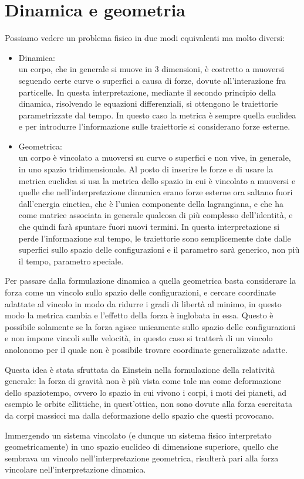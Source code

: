 \documentclass[
10pt, %
a4paper, %
oneside, %
headinclude,footinclude, %
BCOR5mm, %
]{scrartcl}
\begin{document}
\section{Dinamica e geometria}
Possiamo vedere un problema fisico in due modi equivalenti ma molto diversi:
\begin{itemize}
\item Dinamica: \\
un corpo, che in generale si muove in 3 dimensioni, è costretto a muoversi seguendo certe curve o superfici a causa di forze, dovute all'interazione fra particelle. In questa interpretazione, mediante il secondo principio della dinamica, risolvendo le equazioni differenziali, si ottengono le traiettorie parametrizzate dal tempo. In questo caso la metrica è sempre quella euclidea e per introdurre l'informazione sulle traiettorie si considerano forze esterne.
\item Geometrica: \\
un corpo è vincolato a muoversi su curve o superfici e non vive, in generale, in uno spazio tridimensionale. Al posto di inserire le forze e di usare la metrica euclidea si usa la metrica dello spazio in cui è vincolato a muoversi e quelle che nell'interpretazione dinamica erano forze esterne ora saltano fuori dall'energia cinetica, che è l'unica componente della lagrangiana, e che ha come matrice associata in generale qualcosa di più complesso dell'identità, e che quindi farà spuntare fuori nuovi termini. In questa interpretazione si perde l'informazione sul tempo, le traiettorie sono semplicemente date dalle superfici sullo spazio delle configurazioni e il parametro sarà generico, non più il tempo, parametro speciale.
\end{itemize}
Per passare dalla formulazione dinamica a quella geometrica basta considerare la forza come un vincolo sullo spazio delle configurazioni, e cercare coordinate adattate al vincolo in modo da ridurre i gradi di libertà al minimo, in questo modo la metrica cambia e l'effetto della forza è inglobata in essa. Questo è possibile solamente se la forza agisce unicamente sullo spazio delle configurazioni e non impone vincoli sulle velocità, in questo caso si tratterà di un vincolo anolonomo per il quale non è possibile trovare coordinate generalizzate adatte.
\begin{esempio} 
 	Questa idea è stata sfruttata da Einstein nella formulazione della relatività generale: la forza di gravità non è più vista come tale ma come deformazione dello spaziotempo, ovvero lo spazio in cui vivono i corpi, i moti dei pianeti, ad esempio le orbite ellittiche, in quest'ottica, non sono dovute alla forza esercitata da corpi massicci ma dalla deformazione dello spazio che questi provocano.
\end{esempio}
\begin{osservazione}
	Immergendo un sistema vincolato (e dunque un sistema fisico interpretato geometricamente) in uno spazio euclideo di dimensione superiore, quello che sembrava un vincolo nell'interpretazione geometrica, risulterà pari alla forza vincolare nell'interpretazione dinamica.
\end{osservazione} 
\end{document}
